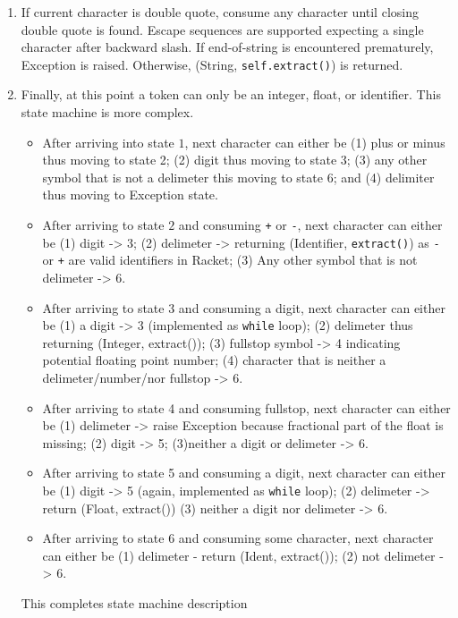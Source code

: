 \begin{itemize}
\begin{enumerate}
\item If current character is double quote, consume any character until closing double quote is found. Escape sequences are supported expecting a single character after backward slash. If end-of-string is encountered prematurely, Exception is raised. Otherwise, (String, \texttt{self.extract()}) is returned.

\item Finally, at this point a token can only be an integer, float, or identifier. This state machine is more complex.

\begin{itemize}
\item After arriving into state $1$, next character can either be (1) plus or minus thus moving to state 2;  (2) digit thus moving to state 3; (3) any other symbol that is not a delimeter this moving to state 6; and (4) delimiter thus moving to Exception state.
\item After arriving to state $2$ and consuming \texttt{+} or \texttt{-}, next character can either be (1) digit -> 3; (2) delimeter -> returning (Identifier, \texttt{extract()}) as \texttt{-} or \texttt{+} are valid identifiers in Racket; (3) Any other symbol that is not delimeter -> 6.
\item After arriving to state 3 and consuming a digit, next character can either be (1) a digit -> 3 (implemented as \texttt{while} loop); (2) delimeter thus returning (Integer, extract()); (3) fullstop symbol -> 4 indicating potential floating point number; (4) character that is neither a delimeter/number/nor fullstop -> 6.
\item After arriving to state 4 and consuming fullstop, next character can either be (1) delimeter -> raise Exception because fractional part of the float is missing; (2) digit -> 5; (3)neither a digit or delimeter -> 6.
\item After arriving to state 5 and consuming a digit, next character can either be (1) digit -> 5 (again, implemented as \texttt{while} loop); (2) delimeter -> return (Float, extract()) (3) neither a digit nor delimeter -> 6.
\item After arriving to state 6 and consuming some character, next character can either be (1) delimeter - return (Ident, extract()); (2) not delimeter -> 6.

\end{itemize}
This completes state machine description
\end{enumerate}

\end{itemize}

